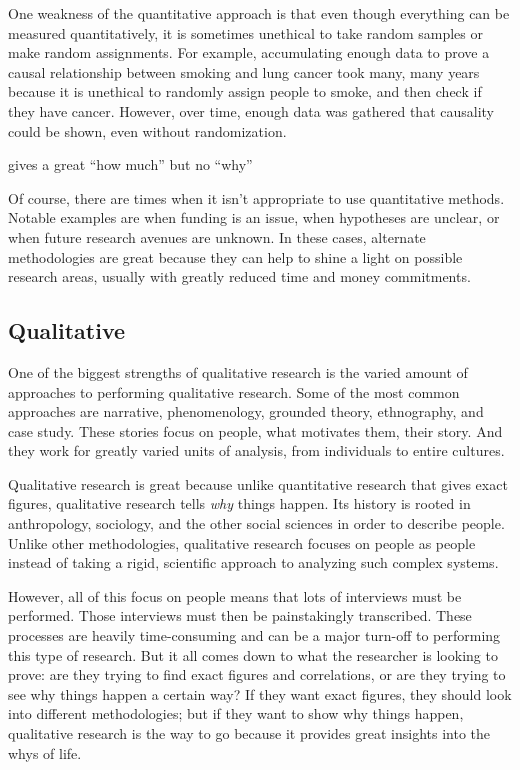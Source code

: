 \documentclass[man,natbib]{apa6}
\begin{document}
One weakness of the quantitative approach is that even though everything can be measured quantitatively, it is sometimes unethical to take random samples or make random assignments. For example, accumulating enough data to prove a causal relationship between smoking and lung cancer took many, many years because it is unethical to randomly assign people to smoke, and then check if they have cancer. However, over time, enough data was gathered that causality could be shown, even without randomization.

gives a great ``how much'' but no ``why''

Of course, there are times when it isn't appropriate to use quantitative methods. Notable examples are when funding is an issue, when hypotheses are unclear, or when future research avenues are unknown. In these cases, alternate methodologies are great because they can help to shine a light on possible research areas, usually with greatly reduced time and money commitments.

\subsection{Qualitative}
One of the biggest strengths of qualitative research is the varied amount of approaches to performing qualitative research. Some of the most common approaches are narrative, phenomenology, grounded theory, ethnography, and case study. These stories focus on people, what motivates them, their story. And they work for greatly varied units of analysis, from individuals to entire cultures.

Qualitative research is great because unlike quantitative research that gives exact figures, qualitative research tells \emph{why} things happen. Its history is rooted in anthropology, sociology, and the other social sciences in order to describe people. Unlike other methodologies, qualitative research focuses on people as people instead of taking a rigid, scientific approach to analyzing such complex systems.

However, all of this focus on people means that lots of interviews must be performed. Those interviews must then be painstakingly transcribed. These processes are heavily time-consuming and can be a major turn-off to performing this type of research. But it all comes down to what the researcher is looking to prove: are they trying to find exact figures and correlations, or are they trying to see why things happen a certain way? If they want exact figures, they should look into different methodologies; but if they want to show why things happen, qualitative research is the way to go because it provides great insights into the whys of life.
\end{document}
